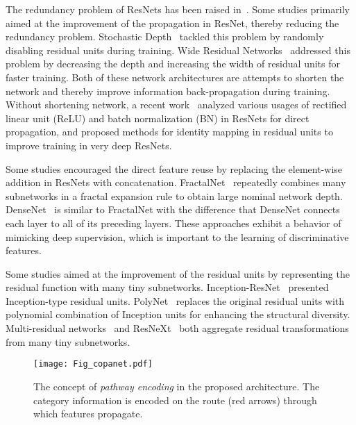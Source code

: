 \documentclass[wcp]{jmlr}
\begin{document}
The redundancy problem of ResNets has been raised in~\citep{huang2016deep, zagoruyko2016wide}.
Some studies primarily aimed at the improvement of the propagation in ResNet, thereby reducing the redundancy problem.
Stochastic Depth~\citep{huang2016deep} tackled this problem by randomly disabling residual units during training.
Wide Residual Networks~\citep{zagoruyko2016wide} addressed this problem by decreasing the depth and increasing the width of residual units for faster training. 
Both of these network architectures are attempts to shorten the network and thereby improve information back-propagation during training. 
Without shortening network, a recent work~\citep{he2016identity} analyzed various usages of rectified linear unit (ReLU) and batch normalization (BN) in ResNets for direct propagation, and proposed methods for identity mapping in residual units to improve training in very deep ResNets. 

Some studies encouraged the direct feature reuse by replacing the element-wise addition in ResNets with concatenation.
FractalNet~\citep{larsson2016fractalnet} repeatedly combines many subnetworks in a fractal expansion rule to obtain large nominal network depth.
DenseNet~\citep{huang2016densely} is similar to FractalNet with the difference that DenseNet connects each layer to all of its preceding layers.
These approaches exhibit a behavior of mimicking deep supervision, which is important to the learning of discriminative features.

Some studies aimed at the improvement of the residual units by representing the residual function with many tiny subnetworks.
Inception-ResNet~\citep{szegedy2016inception} presented Inception-type residual units.
PolyNet~\citep{zhang2016polynet} replaces the original residual units with polynomial combination of Inception units for enhancing the structural diversity. 
Multi-residual networks~\citep{abdi2016multi} and ResNeXt~\citep{xie2016aggregated} both aggregate residual transformations from many tiny subnetworks.

\begin{figure}[tbp]
\begin{center}
	\texttt{[image: Fig\_copanet.pdf]}
\end{center}
  \caption{The concept of \textit{pathway encoding} in the proposed architecture. The category information is encoded on the route (red arrows) through which features propagate.}
\label{copanet}
\end{figure}
\end{document}
